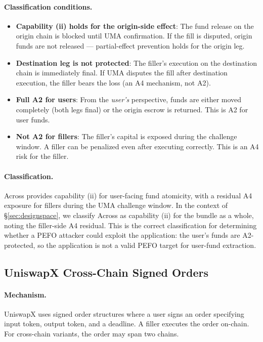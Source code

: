 \paragraph{Classification conditions.}
\begin{itemize}
  \item \textbf{Capability (ii) holds for the origin-side effect}: The fund
    release on the origin chain is blocked until UMA confirmation. If the fill
    is disputed, origin funds are not released --- partial-effect prevention holds
    for the origin leg.
  \item \textbf{Destination leg is not protected}: The filler's execution on
    the destination chain is immediately final. If UMA disputes the fill after
    destination execution, the filler bears the loss (an A4 mechanism, not A2).
  \item \textbf{Full A2 for users}: From the \emph{user's} perspective, funds
    are either moved completely (both legs final) or the origin escrow is
    returned. This is A2 for user funds.
  \item \textbf{Not A2 for fillers}: The filler's capital is exposed during the
    challenge window. A filler can be penalized even after executing correctly.
    This is an A4 risk for the filler.
\end{itemize}

\paragraph{Classification.}
Across provides capability (ii) for user-facing fund atomicity, with a residual
A4 exposure for fillers during the UMA challenge window. In the context of
\S\ref{sec:designspace}, we classify Across as capability (ii) for the bundle
as a whole, noting the filler-side A4 residual. This is the correct
classification for determining whether a PEFO attacker could exploit the
application: the user's funds are A2-protected, so the application is not a
valid PEFO target for user-fund extraction.

\subsection{UniswapX Cross-Chain Signed Orders}
\label{app:uniswapx}

\paragraph{Mechanism.}
UniswapX uses signed order structures where a user signs an order specifying
input token, output token, and a deadline. A filler executes the order
on-chain. For cross-chain variants, the order may span two chains.

